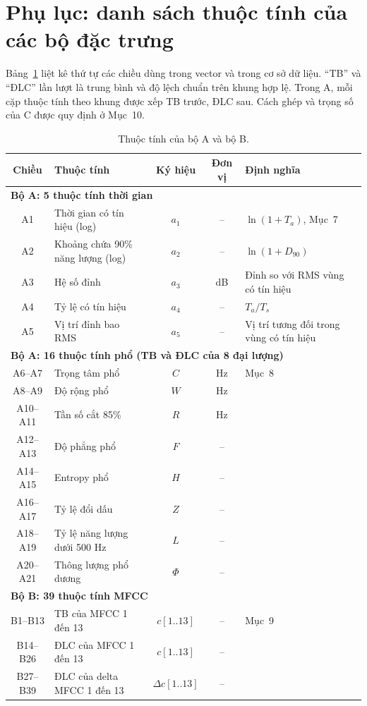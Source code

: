 \documentclass[11pt,a4paper]{article}
\begin{document}
\section*{Phụ lục: danh sách thuộc tính của các bộ đặc trưng}
Bảng~\ref{tab:thuoctinh} liệt kê thứ tự các chiều dùng trong vector và trong cơ sở dữ liệu. ``TB'' và ``ĐLC'' lần lượt là trung bình và độ lệch chuẩn trên khung hợp lệ. Trong A, mỗi cặp thuộc tính theo khung được xếp TB trước, ĐLC sau. Cách ghép và trọng số của C được quy định ở Mục~10.
\begin{table}[htbp]
\centering\small
\caption{Thuộc tính của bộ A và bộ B.}\label{tab:thuoctinh}
\begin{tabularx}{\textwidth}{clccX}
\toprule
Chiều & Thuộc tính & Ký hiệu & Đơn vị & Định nghĩa\\\midrule
\multicolumn{5}{l}{\textbf{Bộ A: 5 thuộc tính thời gian}}\\
A1 & Thời gian có tín hiệu (log) & $a_1$ & -- & $\ln(1+T_a)$, Mục~7\\
A2 & Khoảng chứa 90\% năng lượng (log) & $a_2$ & -- & $\ln(1+D_{90})$\\
A3 & Hệ số đỉnh & $a_3$ & dB & Đỉnh so với RMS vùng có tín hiệu\\
A4 & Tỷ lệ có tín hiệu & $a_4$ & -- & $T_a/T_s$\\
A5 & Vị trí đỉnh bao RMS & $a_5$ & -- & Vị trí tương đối trong vùng có tín hiệu\\\midrule
\multicolumn{5}{l}{\textbf{Bộ A: 16 thuộc tính phổ (TB và ĐLC của 8 đại lượng)}}\\
A6--A7 & Trọng tâm phổ & $C$ & Hz & Mục~8\\
A8--A9 & Độ rộng phổ & $W$ & Hz & \\
A10--A11 & Tần số cắt 85\% & $R$ & Hz & \\
A12--A13 & Độ phẳng phổ & $F$ & -- & \\
A14--A15 & Entropy phổ & $H$ & -- & \\
A16--A17 & Tỷ lệ đổi dấu & $Z$ & -- & \\
A18--A19 & Tỷ lệ năng lượng dưới 500 Hz & $L$ & -- & \\
A20--A21 & Thông lượng phổ dương & $\Phi$ & -- & \\\midrule
\multicolumn{5}{l}{\textbf{Bộ B: 39 thuộc tính MFCC}}\\
B1--B13 & TB của MFCC 1 đến 13 & $c[1..13]$ & -- & Mục~9\\
B14--B26 & ĐLC của MFCC 1 đến 13 & $c[1..13]$ & -- & \\
B27--B39 & ĐLC của delta MFCC 1 đến 13 & $\Delta c[1..13]$ & -- & \\\bottomrule
\end{tabularx}
\end{table}
\clearpage
\end{document}
